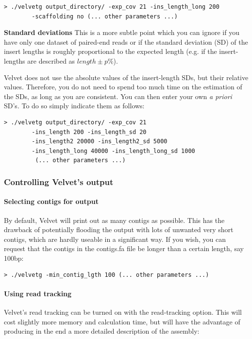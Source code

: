 \documentclass{article}
\begin{document}
\begin{verbatim}
> ./velvetg output_directory/ -exp_cov 21 -ins_length_long 200
		-scaffolding no (... other parameters ...)
\end{verbatim}

\textbf{Standard deviations} This is a more subtle point which you can ignore if you have only one dataset of paired-end reads or if the standard deviation (SD) of the insert lengths is roughly proportional to the expected length (e.g. if the insert-lengths are described as $length \pm p\%$).

Velvet does not use the absolute values of the insert-length SDs, but their relative values. Therefore, you do not need to spend too much time on the estimation of the SDs, as long as you are consistent. You can then enter your own \emph{a priori} SD's. To do so simply indicate them as follows:

\begin{verbatim}
> ./velvetg output_directory/ -exp_cov 21 
		-ins_length 200 -ins_length_sd 20
		-ins_length2 20000 -ins_length2_sd 5000
		-ins_length_long 40000 -ins_length_long_sd 1000
		 (... other parameters ...)
\end{verbatim}

	\subsubsection{Controlling Velvet's output}

	\paragraph{Selecting contigs for output}

By default, Velvet will print out as many contigs as possible. This has the drawback of potentially flooding the output with lots of unwanted very short contigs, which are hardly useable in a significant way. If you wish, you can request that the contigs in the contigs.fa file be longer than a certain length, say 100bp:

\begin{verbatim}
> ./velvetg -min_contig_lgth 100 (... other parameters ...)
\end{verbatim}

	\paragraph{Using read tracking} 
	
Velvet's read tracking can be turned on with the read-tracking option. This will cost slightly more memory and calculation time, but will have the advantage of producing in the end a more detailed description of the assembly:
\end{document}
